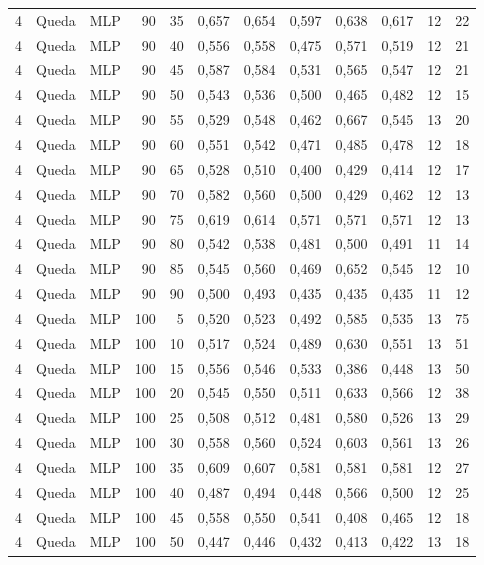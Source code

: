 \begin{longtable}{@{}rllrrrrrrrrr@{}}
4 & Queda & MLP & 90 & 35 & 0,657 & 0,654 & 0,597 & 0,638 & 0,617 & 12 & 22 \\
4 & Queda & MLP & 90 & 40 & 0,556 & 0,558 & 0,475 & 0,571 & 0,519 & 12 & 21 \\
4 & Queda & MLP & 90 & 45 & 0,587 & 0,584 & 0,531 & 0,565 & 0,547 & 12 & 21 \\
4 & Queda & MLP & 90 & 50 & 0,543 & 0,536 & 0,500 & 0,465 & 0,482 & 12 & 15 \\
4 & Queda & MLP & 90 & 55 & 0,529 & 0,548 & 0,462 & 0,667 & 0,545 & 13 & 20 \\
4 & Queda & MLP & 90 & 60 & 0,551 & 0,542 & 0,471 & 0,485 & 0,478 & 12 & 18 \\
4 & Queda & MLP & 90 & 65 & 0,528 & 0,510 & 0,400 & 0,429 & 0,414 & 12 & 17 \\
4 & Queda & MLP & 90 & 70 & 0,582 & 0,560 & 0,500 & 0,429 & 0,462 & 12 & 13 \\
4 & Queda & MLP & 90 & 75 & 0,619 & 0,614 & 0,571 & 0,571 & 0,571 & 12 & 13 \\
4 & Queda & MLP & 90 & 80 & 0,542 & 0,538 & 0,481 & 0,500 & 0,491 & 11 & 14 \\
4 & Queda & MLP & 90 & 85 & 0,545 & 0,560 & 0,469 & 0,652 & 0,545 & 12 & 10 \\
4 & Queda & MLP & 90 & 90 & 0,500 & 0,493 & 0,435 & 0,435 & 0,435 & 11 & 12 \\
4 & Queda & MLP & 100 & 5 & 0,520 & 0,523 & 0,492 & 0,585 & 0,535 & 13 & 75 \\
4 & Queda & MLP & 100 & 10 & 0,517 & 0,524 & 0,489 & 0,630 & 0,551 & 13 & 51 \\
4 & Queda & MLP & 100 & 15 & 0,556 & 0,546 & 0,533 & 0,386 & 0,448 & 13 & 50 \\
4 & Queda & MLP & 100 & 20 & 0,545 & 0,550 & 0,511 & 0,633 & 0,566 & 12 & 38 \\
4 & Queda & MLP & 100 & 25 & 0,508 & 0,512 & 0,481 & 0,580 & 0,526 & 13 & 29 \\
4 & Queda & MLP & 100 & 30 & 0,558 & 0,560 & 0,524 & 0,603 & 0,561 & 13 & 26 \\
4 & Queda & MLP & 100 & 35 & 0,609 & 0,607 & 0,581 & 0,581 & 0,581 & 12 & 27 \\
4 & Queda & MLP & 100 & 40 & 0,487 & 0,494 & 0,448 & 0,566 & 0,500 & 12 & 25 \\
4 & Queda & MLP & 100 & 45 & 0,558 & 0,550 & 0,541 & 0,408 & 0,465 & 12 & 18 \\
4 & Queda & MLP & 100 & 50 & 0,447 & 0,446 & 0,432 & 0,413 & 0,422 & 13 & 18 \\

\end{longtable}
